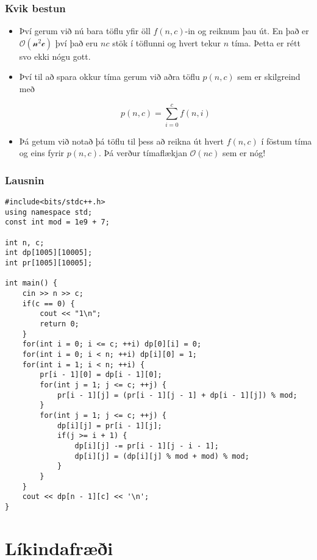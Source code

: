 \documentclass{beamer}
\begin{document}
\begin{frame}
\frametitle{Kvik bestun}

\begin{itemize}

\item<1-> Því gerum við nú bara töflu yfir öll $f(n, c)$-in og reiknum þau út. En það er $\mathcal{O(n^2c)}$ því það eru $nc$ stök í töflunni og hvert tekur $n$ tíma. Þetta er rétt svo ekki nógu gott.

\item<2-> Því til að spara okkur tíma gerum við aðra töflu $p(n, c)$ sem er skilgreind með

\[p(n, c) = \sum_{i = 0}^c f(n, i)\]

\item<3-> Þá getum við notað þá töflu til þess að reikna út hvert $f(n, c)$ í föstum tíma og eins fyrir $p(n, c)$. Þá verður tímaflækjan $\mathcal{O}(nc)$ sem er nóg!

\end{itemize}

\end{frame}

\begin{frame}[fragile]
\frametitle{Lausnin}

\begin{tiny}
\begin{verbatim}
#include<bits/stdc++.h>
using namespace std;
const int mod = 1e9 + 7;

int n, c;
int dp[1005][10005];
int pr[1005][10005];

int main() {
    cin >> n >> c;
    if(c == 0) {
        cout << "1\n";
        return 0;
    }
    for(int i = 0; i <= c; ++i) dp[0][i] = 0;
    for(int i = 0; i < n; ++i) dp[i][0] = 1;
    for(int i = 1; i < n; ++i) {
        pr[i - 1][0] = dp[i - 1][0];
        for(int j = 1; j <= c; ++j) {
            pr[i - 1][j] = (pr[i - 1][j - 1] + dp[i - 1][j]) % mod;
        }
        for(int j = 1; j <= c; ++j) {
            dp[i][j] = pr[i - 1][j];
            if(j >= i + 1) {
                dp[i][j] -= pr[i - 1][j - i - 1];
                dp[i][j] = (dp[i][j] % mod + mod) % mod;
            }
        }
    }
    cout << dp[n - 1][c] << '\n';
}
\end{verbatim}
\end{tiny}

\end{frame}

\section[Líkindafræði]{Líkindafræði}
\end{document}
